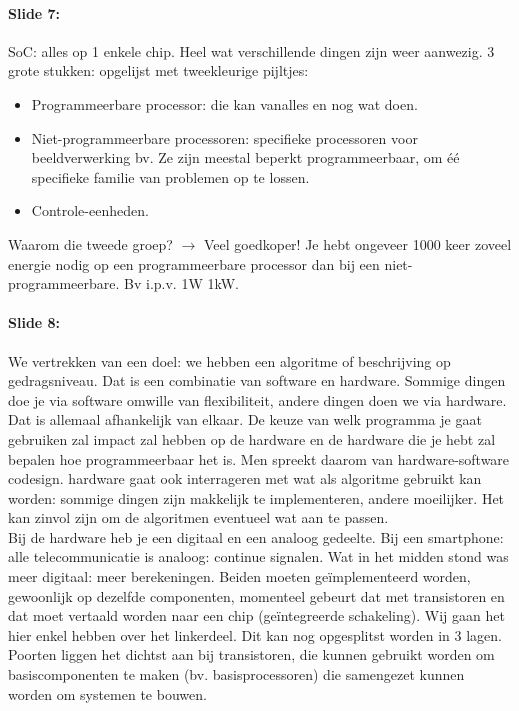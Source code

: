 \documentclass[10pt,a4paper]{book}
\begin{document}
\paragraph{Slide 7:} SoC: alles op 1 enkele chip. Heel wat verschillende dingen zijn weer aanwezig. 3 grote stukken: opgelijst met tweekleurige pijltjes:
\begin{itemize}
\item Programmeerbare processor: die kan vanalles en nog wat doen.
\item Niet-programmeerbare processoren: specifieke processoren voor beeldverwerking bv. Ze zijn meestal beperkt programmeerbaar, om \'e\'e specifieke familie van problemen op te lossen.
\item Controle-eenheden.
\end{itemize}
Waarom die tweede groep? $\rightarrow$ Veel goedkoper! Je hebt ongeveer 1000 keer zoveel energie nodig op een programmeerbare processor dan bij een niet-programmeerbare. Bv i.p.v. 1W 1kW.

\paragraph{Slide 8:} We vertrekken van een doel: we hebben een algoritme of beschrijving op gedragsniveau. Dat is een combinatie van software en hardware. Sommige dingen doe je via software omwille van flexibiliteit, andere dingen doen we via hardware. Dat is allemaal afhankelijk van elkaar. De keuze van welk programma je gaat gebruiken zal impact zal hebben op de hardware en de hardware die je hebt zal bepalen hoe programmeerbaar het is. Men spreekt daarom van hardware-software codesign. hardware gaat ook interrageren met wat als algoritme gebruikt kan worden: sommige dingen zijn makkelijk te implementeren, andere moeilijker. Het kan zinvol zijn om de algoritmen eventueel wat aan te passen. \\
Bij de hardware heb je een digitaal en een analoog gedeelte. Bij een smartphone: alle telecommunicatie is analoog: continue signalen. Wat in het midden stond was meer digitaal: meer berekeningen. Beiden moeten ge\"implementeerd worden, gewoonlijk op dezelfde componenten, momenteel gebeurt dat met transistoren en dat moet vertaald worden naar een chip (ge\"integreerde schakeling). Wij gaan het hier enkel hebben over het linkerdeel. Dit kan nog opgesplitst worden in 3 lagen. Poorten liggen het dichtst aan bij transistoren, die kunnen gebruikt worden om basiscomponenten te maken (bv. basisprocessoren) die samengezet kunnen worden om systemen te bouwen.
\end{document}
